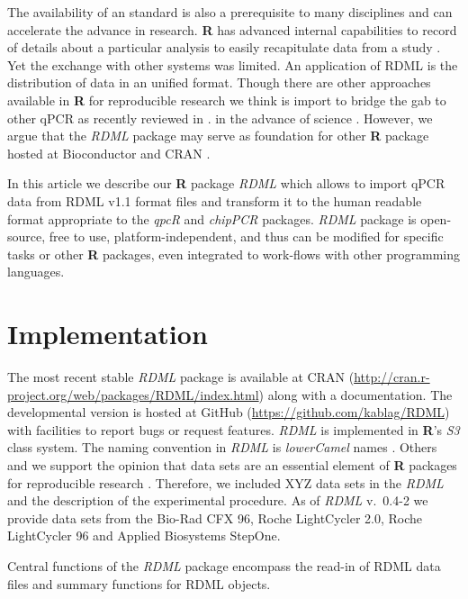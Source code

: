 \documentclass{bioinfo}
\begin{document}
The availability of an standard is also a prerequisite to many disciplines and 
can accelerate the advance in research. \textbf{R} has advanced internal 
capabilities to record of details about a particular analysis to easily 
recapitulate data from a study \cite{liu_2014}. Yet the exchange with other 
systems was limited. An application of RDML is the distribution of data in an 
unified format. Though there are other approaches available in \textbf{R} for 
reproducible research \cite{Leeper_2014} we think is import to bridge the gab to 
other qPCR as recently reviewed in \cite{pabinger_2014}. in the advance of 
science \cite{gentleman_2004}. However, we argue that the \textit{RDML} package 
may serve as foundation for other \textbf{R} package hosted at Bioconductor 
\cite{gentleman_2004} and CRAN \cite{RCT}.

In this article we describe our \textbf{R} package \textit{RDML} which allows to 
import qPCR data from RDML v1.1 format files and transform it to the human 
readable format appropriate to the \textit{qpcR} and \textit{chipPCR} packages. 
\textit{RDML} package is open-source, free to use, platform-independent, and 
thus can be modified for specific tasks or other \textbf{R} packages, even 
integrated to work-flows with other programming languages.

\section{Implementation}

The most recent stable \textit{RDML} package is available at CRAN 
(\url{http://cran.r-project.org/web/packages/RDML/index.html}) along with a 
documentation. The developmental version is hosted at GitHub 
(\url{https://github.com/kablag/RDML}) with facilities to report bugs or request 
features. \textit{RDML} is implemented in \textbf{R}’s \emph{S3} class system. 
The naming convention in \textit{RDML} is \textit{lowerCamel} names 
\cite{Baaaath_2012}. Others and we support the opinion that data sets are an 
essential element of \textbf{R} packages for reproducible research 
\cite{gentleman_2004,hofmann_2013,Leeper_2014}. Therefore, we included XYZ data 
sets in the \textit{RDML} and the description of the experimental procedure. As 
of \textit{RDML} v.~0.4-2 we provide data sets from the Bio-Rad CFX 96, Roche 
LightCycler 2.0, Roche LightCycler 96 and Applied Biosystems StepOne.

Central functions of the \textit{RDML} package encompass the read-in of RDML 
data files and summary functions for RDML objects.
\end{document}
